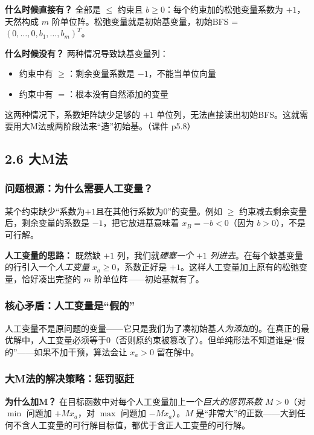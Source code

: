 \textbf{什么时候直接有？} 全部是 $\le$ 约束且 $b\ge 0$：每个约束加的松弛变量系数为 $+1$，天然构成 $m$ 阶单位阵。松弛变量就是初始基变量，初始BFS = $(0,\dots,0,b_1,\dots,b_m)^T$。

\textbf{什么时候没有？} 两种情况导致缺基变量列：
\begin{itemize}
  \item 约束中有 $\ge$：剩余变量系数是 $-1$，不能当单位向量
  \item 约束中有 $=$：根本没有自然添加的变量
\end{itemize}
这两种情况下，系数矩阵缺少足够的 $+1$ 单位列，无法直接读出初始BFS。这就需要用大M法或两阶段法来“造”初始基。（课件 p5.8）

\subsection{2.6 大M法}

\subsubsection{问题根源：为什么需要人工变量？}

某个约束缺少“系数为$+1$且在其他行系数为0”的变量。例如 $\ge$ 约束减去剩余变量后，剩余变量的系数是 $-1$，把它放进基意味着 $x_B = -b < 0$（因为 $b>0$），不是可行解。

\textbf{人工变量的思路：} 既然缺 $+1$ 列，我们就\emph{硬塞一个 $+1$ 列进去}。在每个缺基变量的行引入一个\emph{人工变量} $x_a\ge 0$，系数正好是 $+1$。这样人工变量加上原有的松弛变量，恰好凑出完整的 $m$ 阶单位阵——初始基就有了。

\subsubsection{核心矛盾：人工变量是“假的”}

人工变量不是原问题的变量——它只是我们为了凑初始基\emph{人为添加}的。在真正的最优解中，人工变量必须等于0（否则原约束被篡改了）。但单纯形法不知道谁是“假的”——如果不加干预，算法会让 $x_a>0$ 留在解中。

\subsubsection{大M法的解决策略：惩罚驱赶}

\textbf{为什么加M？} 在目标函数中对每个人工变量加上一个\emph{巨大的惩罚系数 $M>0$}（对 $\min$ 问题加 $+M x_a$，对 $\max$ 问题加 $-M x_a$）。$M$ 是“非常大”的正数——大到任何不含人工变量的可行解目标值，都优于含正人工变量的可行解。

